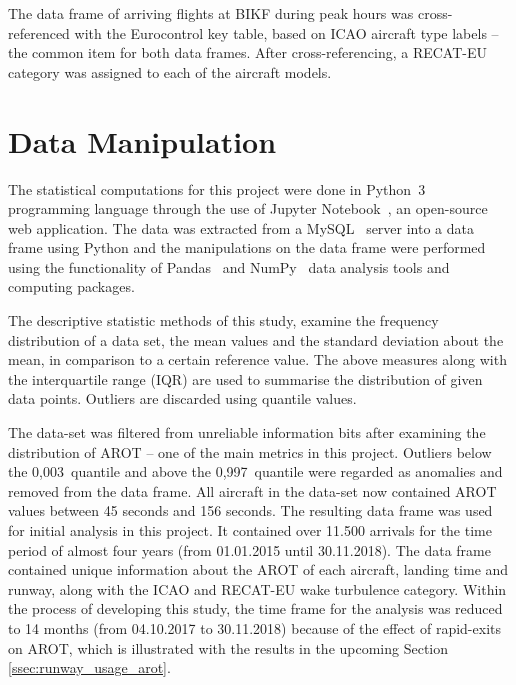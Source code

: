 The data frame of arriving flights at BIKF during peak hours was cross-referenced with the Eurocontrol key table, based on ICAO aircraft type labels -- the common item for both data frames. After cross-referencing, a RECAT-EU category was assigned to each of the aircraft models.

\section{Data Manipulation}

The statistical computations for this project were done in Python~3~\cite{python} programming language through the use of Jupyter Notebook~\cite{jupyter}, an open-source web application. The data was extracted from a MySQL~\cite{mysql} server into a data frame using Python and the manipulations on the data frame were performed using the functionality of Pandas~\cite{pandas} and NumPy~\cite{numpy} data analysis tools and computing packages.

The descriptive statistic methods of this study, examine the frequency distribution of a data set, the mean values and the standard deviation about the mean, in comparison to a certain reference value. The above measures along with the interquartile range (IQR) are used to summarise the distribution of given data points. Outliers are discarded using quantile values.

The data-set was filtered from unreliable information bits after examining the distribution of AROT -- one of the main metrics in this project. Outliers below the 0,003~quantile and above the 0,997~quantile were regarded as anomalies and removed from the data frame. All aircraft in the data-set now contained AROT values between 45 seconds and 156 seconds. The resulting data frame was used for initial analysis in this project. It contained over 11.500 arrivals for the time period of almost four years (from 01.01.2015 until 30.11.2018). The data frame contained unique information about the AROT of each aircraft, landing time and runway, along with the ICAO and RECAT-EU wake turbulence category. Within the process of developing this study, the time frame for the analysis was reduced to 14 months (from 04.10.2017 to 30.11.2018) because of the effect of rapid-exits on AROT, which is illustrated with the results in the upcoming Section \ref{ssec:runway_usage_arot}.




